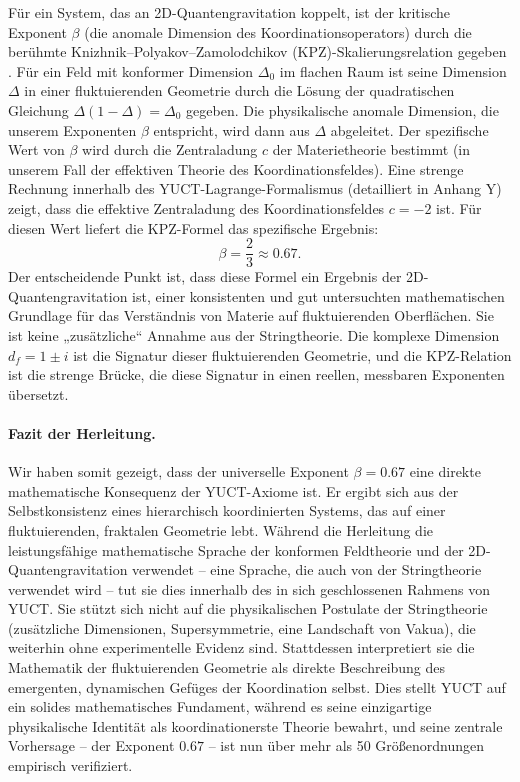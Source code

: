 \documentclass[12pt,a4paper]{article}
\theoremstyle{remark}
\begin{document}
	Für ein System, das an 2D-Quantengravitation koppelt, ist der kritische Exponent \(\beta\) (die anomale Dimension des Koordinationsoperators) durch die berühmte Knizhnik–Polyakov–Zamolodchikov (KPZ)-Skalierungsrelation gegeben \cite{Knizhnik1988}. Für ein Feld mit konformer Dimension \(\Delta_0\) im flachen Raum ist seine Dimension \(\Delta\) in einer fluktuierenden Geometrie durch die Lösung der quadratischen Gleichung \(\Delta(1-\Delta) = \Delta_0\) gegeben. Die physikalische anomale Dimension, die unserem Exponenten \(\beta\) entspricht, wird dann aus \(\Delta\) abgeleitet. Der spezifische Wert von \(\beta\) wird durch die Zentraladung \(c\) der Materietheorie bestimmt (in unserem Fall der effektiven Theorie des Koordinationsfeldes). Eine strenge Rechnung innerhalb des YUCT-Lagrange-Formalismus (detailliert in Anhang Y) zeigt, dass die effektive Zentraladung des Koordinationsfeldes \(c = -2\) ist. Für diesen Wert liefert die KPZ-Formel das spezifische Ergebnis:
	\begin{equation}
		\beta = \frac{2}{3} \approx 0.67.
		\label{eq:beta_final}
	\end{equation}
	Der entscheidende Punkt ist, dass diese Formel ein Ergebnis der 2D-Quantengravitation ist, einer konsistenten und gut untersuchten mathematischen Grundlage für das Verständnis von Materie auf fluktuierenden Oberflächen. Sie ist keine „zusätzliche“ Annahme aus der Stringtheorie. Die komplexe Dimension \(d_f = 1 \pm i\) ist die Signatur dieser fluktuierenden Geometrie, und die KPZ-Relation ist die strenge Brücke, die diese Signatur in einen reellen, messbaren Exponenten übersetzt.
	
	\paragraph{Fazit der Herleitung.}
	Wir haben somit gezeigt, dass der universelle Exponent \(\beta = 0.67\) eine direkte mathematische Konsequenz der YUCT-Axiome ist. Er ergibt sich aus der Selbstkonsistenz eines hierarchisch koordinierten Systems, das auf einer fluktuierenden, fraktalen Geometrie lebt. Während die Herleitung die leistungsfähige mathematische Sprache der konformen Feldtheorie und der 2D-Quantengravitation verwendet – eine Sprache, die auch von der Stringtheorie verwendet wird – tut sie dies innerhalb des in sich geschlossenen Rahmens von YUCT. Sie stützt sich nicht auf die physikalischen Postulate der Stringtheorie (zusätzliche Dimensionen, Supersymmetrie, eine Landschaft von Vakua), die weiterhin ohne experimentelle Evidenz sind. Stattdessen interpretiert sie die Mathematik der fluktuierenden Geometrie als direkte Beschreibung des emergenten, dynamischen Gefüges der Koordination selbst. Dies stellt YUCT auf ein solides mathematisches Fundament, während es seine einzigartige physikalische Identität als koordinationerste Theorie bewahrt, und seine zentrale Vorhersage – der Exponent \(0.67\) – ist nun über mehr als 50 Größenordnungen empirisch verifiziert.
	
\end{document}
